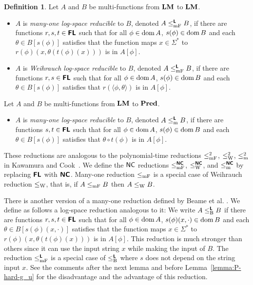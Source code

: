 \documentclass{article}
\theoremstyle{definition}
\newtheorem{definition}[theorem]{Definition}
\theoremstyle{remark}
\begin{document}
\begin{definition}
Let $A$ and $B$ be multi-functions from $\mathbf{LM}$ to $\mathbf{LM}$.
\begin{itemize}
 \item $A$ is \emph{many-one log-space reducible} to $B$, 
       denoted $A \leq _{\mathrm{mF}} ^{\text{\bfseries \sffamily \upshape L}} B$,
       if there are functions $r, s, t \in \text{\bfseries \sffamily \upshape FL}$ such that 
       for all $\phi \in \mathop{\rm dom} A$,
       $s(\phi) \in \mathop{\rm dom} B$ and each $\theta \in B[s(\phi)]$ satisfies that
       the function maps $x \in \Sigma^*$ to $r(\phi)(x, \theta(t(\phi)(x)))$
       is in $A[\phi]$.
 \item $A$ is \emph{Weihrauch log-space reducible} to $B$,
       denoted $A \leq _{\mathrm{mF}} ^{\text{\bfseries \sffamily \upshape L}} B$,
       if there are functions $r, s \in \text{\bfseries \sffamily \upshape FL}$ such that 
       for all $\phi \in \mathop{\rm dom} A$,
       $s(\phi) \in \mathop{\rm dom} B$ and each $\theta \in B[s(\phi)]$ satisfies that
       $r(\langle \phi, \theta \rangle)$ is in $A[\phi]$.
\end{itemize}
Let $A$ and $B$ be multi-functions from $\mathbf{LM}$ to $\mathbf{Pred}$.
\begin{itemize}
 \item $A$ is \emph{many-one log-space reducible} to $B$, denoted 
       $A \leq _{\mathrm{m}} ^{\text{\bfseries \sffamily \upshape L}} B$, if there are functions $s, t \in \text{\bfseries \sffamily \upshape FL}$ such that 
       for all $\phi \in \mathop{\rm dom} A$, $s(\phi) \in \mathop{\rm dom} B$ and each 
       $\theta \in B[s(\phi)]$ satisfies that $\theta \circ t(\phi)$ is in $A[\phi]$.
\end{itemize} 
\end{definition}

These reductions are analogous to the polynomial-time reductions 
$\leq _{\mathrm{mF}}^2$, $\leq _{\mathrm W}^2$, $\leq _{\mathrm{m}}^2$ in Kawamura and Cook~\cite{kawamura2012complexity}.
We define the $\mathsf{NC}$ reductions $\leq _{\mathrm{mF}}^{\text{\bfseries \sffamily \upshape NC}}$, $\leq _{\mathrm W}^{\text{\bfseries \sffamily \upshape NC}}$,
and $\leq _{\mathrm{m}}^{\text{\bfseries \sffamily \upshape NC}}$ by replacing $\text{\bfseries \sffamily \upshape FL}$ with $\text{\bfseries \sffamily \upshape NC}$.
Many-one reduction $\leq _{\mathrm{mF}}$ is a special case of Weihrauch reduction $\leq _{\mathrm W}$,
that is, if $A \leq _{\mathrm{mF}} B$ then $A \leq _{\mathrm W} B$.

There is another version of a many-one reduction defined by
Beame et al. \cite{beame1995relative}.
We define as follows a log-space reduction analogous to it:
We write $A \leq _{\mathrm B} ^{\text{\bfseries \sffamily \upshape L}} B$ 
if there are functions $r, s, t \in \text{\bfseries \sffamily \upshape FL}$ such that 
for all $\phi \in \mathop{\rm dom} A$,
$s(\phi)(x, \cdot) \in \mathop{\rm dom} B$ and each $\theta \in B[s(\phi)(x, \cdot)]$ 
satisfies that the function maps $x \in \Sigma^*$ 
to $r(\phi)(x, \theta(t(\phi)(x)))$ is in $A[\phi]$.
This reduction is much stronger than others since
it can use the input string $x$ while making the input of $B$.
The reduction $\leq _{\mathrm{mF}} ^{\text{\bfseries \sffamily \upshape L}}$ is a special case of $\leq _{\mathrm B} ^{\text{\bfseries \sffamily \upshape L}}$ where
$s$ does not depend on the string input $x$.
See the comments after the next lemma and before Lemma~\ref{lemma:P-hard-g_u} for
the disadvantage and the advantage of this reduction.
\end{document}

